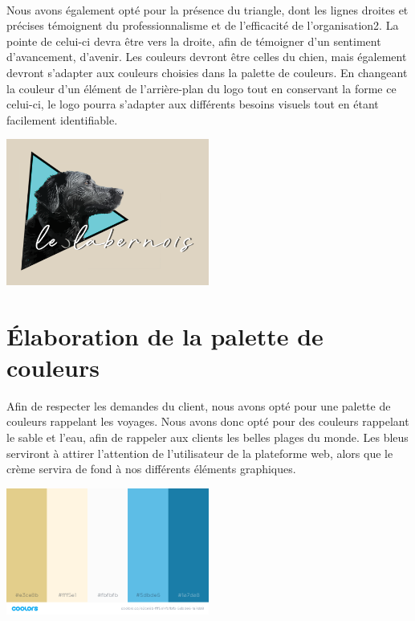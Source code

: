 \documentclass{scrreprt}
\begin{document}
\paragraph{}
Nous avons également opté pour la présence du triangle, dont les lignes droites
et précises témoignent du professionnalisme et de l’efficacité de
l’organisation2. La pointe de celui-ci devra être vers la droite, afin de
témoigner d’un sentiment d’avancement, d’avenir.
Les couleurs devront être celles du chien, mais également devront s’adapter aux
couleurs choisies dans la palette de couleurs. En changeant la couleur d’un
élément de l’arrière-plan du logo tout en conservant la forme ce celui-ci, le
logo pourra s’adapter aux différents besoins visuels tout en étant facilement
identifiable.\\
\begin{center}
  \includegraphics[width=0.5\textwidth]{images/logo.png}
\end{center}
\section{Élaboration de la palette de couleurs}
Afin de respecter les demandes du client, nous avons opté pour une palette de
couleurs rappelant les voyages. Nous avons donc opté pour des couleurs
rappelant le sable et l’eau, afin de rappeler aux clients les belles plages du
monde. Les bleus serviront à attirer l’attention de l’utilisateur de la
plateforme web, alors que le crème servira de fond à nos différents éléments
graphiques. \\
\begin{center}
  \includegraphics[width=0.5\textwidth]{images/palettev2.png}
\end{center}
\end{document}
